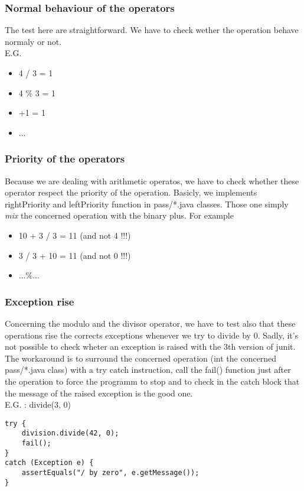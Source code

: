 \documentclass[10pt,a4paper]{article}
\begin{document}
\subsubsection{Normal behaviour of the operators}
	The test here are straightforward. We have to check wether the operation behave normaly or not. \\
	E.G.
	\begin{itemize}
		\item{4 / 3 = 1}
		\item{4 \% 3 = 1}
		\item{+1 = 1}
		\item{...}
	\end{itemize}
\subsubsection{Priority of the operators}
	Because we are dealing with arithmetic operatos, we have to check whether these operator respect the priority of the operation. Basicly, we implements rightPriority and leftPriority function in pass/*.java classes. Those one simply \textit{mix} the concerned operation with the binary plus.
	For example
	\begin{itemize}
		\item{10 + 3 / 3 = 11 (and not 4 !!!)}
		\item{3 / 3 + 10 = 11 (and not 0 !!!)}
		\item{...\%...}
	\end{itemize}		
\subsubsection{Exception rise}
	Concerning the modulo and the divisor operator, we have to test also that these operations rise the corrects exceptions whenever we try to divide by 0. Sadly, it's not possible to check wheter an exception is raised with the 3th version of junit. The workaround is to surround the concerned operation (int the concerned pass/*.java class) with a try catch instruction, call the fail() function just after the operation to force the programm to stop and to check  in the catch block that the message of the raised exception is the good one.\\ 
	E.G. : divide(3, 0)
\begin{lstlisting}
try {
	division.divide(42, 0);
	fail();
}
catch (Exception e) {
	assertEquals("/ by zero", e.getMessage());
}
\end{lstlisting}
\end{document}
